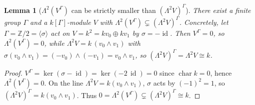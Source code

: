 \documentclass{amsart}
\newtheorem{lemma}{Lemma}
\theoremstyle{definition}
\DeclareMathOperator{\id}{id}
\newcommand{\Gm}{\Gamma}
\begin{document}
\begin{lemma}[$\Lambda^2(V^{\Gm})$ can be strictly smaller than $(\Lambda^2V)^{\Gm}$]
\label{lem:strict}
There exist a finite group $\Gm$ and a $k[\Gm]$-module $V$ with
$\Lambda^2(V^{\Gm})\subsetneq(\Lambda^2 V)^{\Gm}$.  Concretely, let
$\Gm=\mathbb Z/2=\langle\sigma\rangle$ act on $V=k^2=k v_0\oplus k v_1$ by
$\sigma=-\id$.  Then $V^{\Gm}=0$, so $\Lambda^2(V^{\Gm})=0$, while
$\Lambda^2 V=k\,(v_0\wedge v_1)$ with $\sigma(v_0\wedge v_1)=(-v_0)\wedge(-v_1)=
v_0\wedge v_1$, so $(\Lambda^2 V)^{\Gm}=\Lambda^2 V\cong k$.
\end{lemma}
\begin{proof}
$V^{\Gm}=\ker(\sigma-\id)=\ker(-2\,\id)=0$ since $\operatorname{char}k=0$, hence
$\Lambda^2(V^{\Gm})=0$.  On the line $\Lambda^2V=k(v_0\wedge v_1)$, $\sigma$ acts by
$(-1)^2=1$, so $(\Lambda^2V)^{\Gm}=k(v_0\wedge v_1)$.  Thus
$0=\Lambda^2(V^{\Gm})\subsetneq(\Lambda^2V)^{\Gm}\cong k$.
\end{proof}
\end{document}
